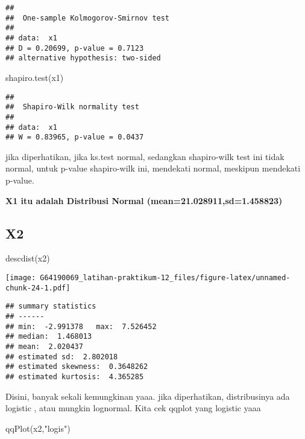 \documentclass[
]{article}
\newenvironment{Shaded}{\begin{snugshade}}{\end{snugshade}}
\newcommand{\FunctionTok}[1]{\textcolor[rgb]{0.00,0.00,0.00}{#1}}
\newcommand{\NormalTok}[1]{#1}
\newcommand{\StringTok}[1]{\textcolor[rgb]{0.31,0.60,0.02}{#1}}
\begin{document}
\begin{verbatim}
## 
##  One-sample Kolmogorov-Smirnov test
## 
## data:  x1
## D = 0.20699, p-value = 0.7123
## alternative hypothesis: two-sided
\end{verbatim}

\begin{Shaded}
\begin{Highlighting}[]
\FunctionTok{shapiro.test}\NormalTok{(x1)}
\end{Highlighting}
\end{Shaded}

\begin{verbatim}
## 
##  Shapiro-Wilk normality test
## 
## data:  x1
## W = 0.83965, p-value = 0.0437
\end{verbatim}

jika diperhatikan, jika ks.test normal, sedangkan shapiro-wilk test ini
tidak normal, untuk p-value shapiro-wilk ini, mendekati normal, meskipun
mendekati p-value.

\textbf{X1 itu adalah Distribusi Normal (mean=21.028911,sd=1.458823)}

\hypertarget{x2-2}{%
\subsection{X2}\label{x2-2}}

\begin{Shaded}
\begin{Highlighting}[]
\FunctionTok{descdist}\NormalTok{(x2)}
\end{Highlighting}
\end{Shaded}

\texttt{[image: G64190069\_latihan-praktikum-12\_files/figure-latex/unnamed-chunk-24-1.pdf]}

\begin{verbatim}
## summary statistics
## ------
## min:  -2.991378   max:  7.526452 
## median:  1.468013 
## mean:  2.020437 
## estimated sd:  2.802018 
## estimated skewness:  0.3648262 
## estimated kurtosis:  4.365285
\end{verbatim}

Disini, banyak sekali kemungkinan yaaa. jika diperhatikan, distribusinya
ada logistic , atau mungkin lognormal. Kita cek qqplot yang logistic
yaaa

\begin{Shaded}
\begin{Highlighting}[]
\FunctionTok{qqPlot}\NormalTok{(x2,}\StringTok{"logis"}\NormalTok{)}
\end{Highlighting}
\end{Shaded}
\end{document}

